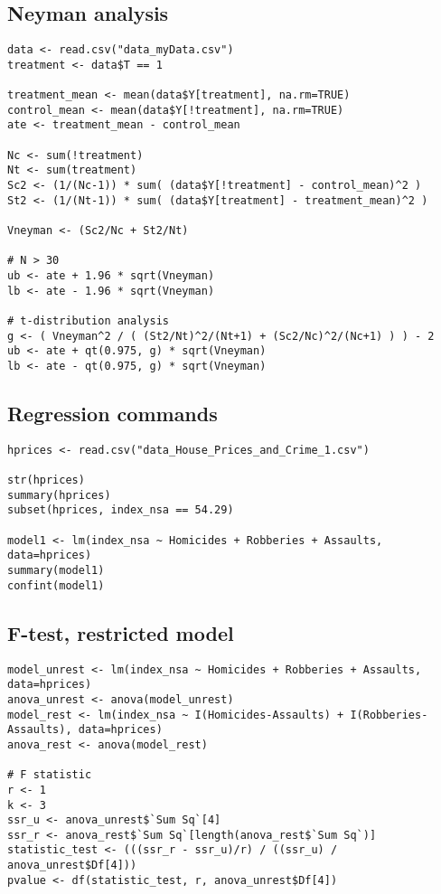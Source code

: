 

\subsection{Neyman analysis}
\begin{lstlisting}
data <- read.csv("data_myData.csv")
treatment <- data$T == 1

treatment_mean <- mean(data$Y[treatment], na.rm=TRUE)
control_mean <- mean(data$Y[!treatment], na.rm=TRUE)
ate <- treatment_mean - control_mean

Nc <- sum(!treatment)
Nt <- sum(treatment)
Sc2 <- (1/(Nc-1)) * sum( (data$Y[!treatment] - control_mean)^2 )
St2 <- (1/(Nt-1)) * sum( (data$Y[treatment] - treatment_mean)^2 )

Vneyman <- (Sc2/Nc + St2/Nt)

# N > 30
ub <- ate + 1.96 * sqrt(Vneyman)
lb <- ate - 1.96 * sqrt(Vneyman)

# t-distribution analysis
g <- ( Vneyman^2 / ( (St2/Nt)^2/(Nt+1) + (Sc2/Nc)^2/(Nc+1) ) ) - 2
ub <- ate + qt(0.975, g) * sqrt(Vneyman)
lb <- ate - qt(0.975, g) * sqrt(Vneyman)
\end{lstlisting}

\subsection{Regression commands}
\begin{lstlisting}
hprices <- read.csv("data_House_Prices_and_Crime_1.csv")

str(hprices)
summary(hprices)
subset(hprices, index_nsa == 54.29)

model1 <- lm(index_nsa ~ Homicides + Robberies + Assaults, data=hprices)
summary(model1)
confint(model1)
\end{lstlisting}

\subsection{F-test, restricted model}
\begin{lstlisting}
model_unrest <- lm(index_nsa ~ Homicides + Robberies + Assaults, data=hprices)
anova_unrest <- anova(model_unrest)
model_rest <- lm(index_nsa ~ I(Homicides-Assaults) + I(Robberies-Assaults), data=hprices)
anova_rest <- anova(model_rest)

# F statistic
r <- 1
k <- 3
ssr_u <- anova_unrest$`Sum Sq`[4]
ssr_r <- anova_rest$`Sum Sq`[length(anova_rest$`Sum Sq`)]
statistic_test <- (((ssr_r - ssr_u)/r) / ((ssr_u) / anova_unrest$Df[4]))
pvalue <- df(statistic_test, r, anova_unrest$Df[4])
\end{lstlisting}

